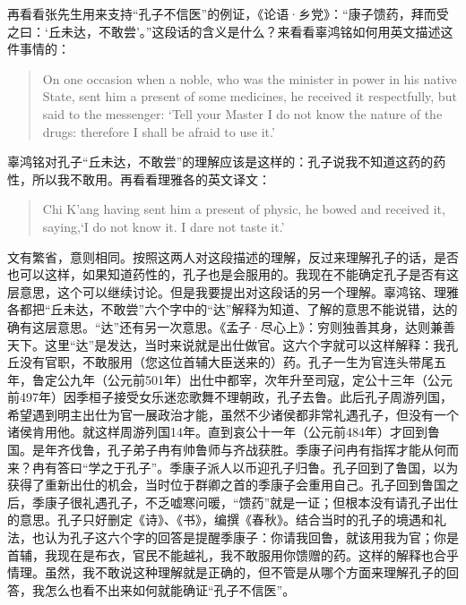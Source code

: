 再看看张先生用来支持“孔子不信医”的例证，《论语·乡党》：“康子馈药，拜而受之曰：‘丘未达，不敢尝’。”这段话的含义是什么？来看看辜鸿铭如何用英文描述这件事情的：
\begin{quote}
On one occasion when a noble, who was the minister in power in his native State, sent him a present of some medicines, he received it respectfully, but said to the messenger: `Tell your Master I do not know the nature of the drugs: therefore I shall be afraid to use it.' 
\end{quote}
辜鸿铭对孔子“丘未达，不敢尝”的理解应该是这样的：孔子说我不知道这药的药性，所以我不敢用。再看看理雅各的英文译文：
\begin{quote}
Chi K'ang having sent him a present of physic, he bowed and received it, saying,`I do not know it. I dare not taste it.'
\end{quote}
文有繁省，意则相同。按照这两人对这段描述的理解，反过来理解孔子的话，是否也可以这样，如果知道药性的，孔子也是会服用的。我现在不能确定孔子是否有这层意思，这个可以继续讨论。但是我要提出对这段话的另一个理解。辜鸿铭、理雅各都把“丘未达，不敢尝”六个字中的“达”解释为知道、了解的意思不能说错，达的确有这层意思。“达”还有另一次意思。《孟子·尽心上》：穷则独善其身，达则兼善天下。这里“达”是发达，当时来说就是出仕做官。这六个字就可以这样解释：我孔丘没有官职，不敢服用（您这位首辅大臣送来的）药。孔子一生为官连头带尾五年，鲁定公九年（公元前501年）出仕中都宰，次年升至司寇，定公十三年（公元前497年）因季桓子接受女乐迷恋歌舞不理朝政，孔子去鲁。此后孔子周游列国，希望遇到明主出仕为官一展政治才能，虽然不少诸侯都非常礼遇孔子，但没有一个诸侯肯用他。就这样周游列国14年。直到哀公十一年（公元前484年）才回到鲁国。是年齐伐鲁，孔子弟子冉有帅鲁师与齐战获胜。季康子问冉有指挥才能从何而来？冉有答曰“学之于孔子”。季康子派人以币迎孔子归鲁。孔子回到了鲁国，以为获得了重新出仕的机会，当时位于群卿之首的季康子会重用自己。孔子回到鲁国之后，季康子很礼遇孔子，不乏嘘寒问暖，“馈药”就是一证；但根本没有请孔子出仕的意思。孔子只好删定《诗》、《书》，编撰《春秋》。结合当时的孔子的境遇和礼法，也认为孔子这六个字的回答是提醒季康子：你请我回鲁，就该用我为官；你是首辅，我现在是布衣，官民不能越礼，我不敢服用你馈赠的药。这样的解释也合乎情理。虽然，我不敢说这种理解就是正确的，但不管是从哪个方面来理解孔子的回答，我怎么也看不出来如何就能确证“孔子不信医”。

